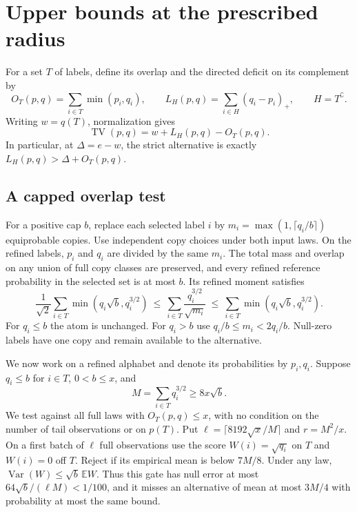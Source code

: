 \section{Upper bounds at the prescribed radius}
\label{sec:upper}

For a set \(T\) of labels, define its overlap and the directed deficit
on its complement by
\[
 O_T(p,q)=\sum_{i\in T}\min(p_i,q_i),\qquad
 L_H(p,q)=\sum_{i\in H}(q_i-p_i)_+,\qquad H=T^\complement .
\]
Writing \(w=q(T)\), normalization gives
\begin{equation}
 \operatorname{TV}(p,q)=w+L_H(p,q)-O_T(p,q).
 \label{eq:upper-head-tail}
\end{equation}
In particular, at \(\Delta=e-w\), the strict alternative is exactly
\(L_H(p,q)>\Delta+O_T(p,q)\).

\subsection{A capped overlap test}

For a positive cap \(b\), replace each selected label \(i\) by
\(m_i=\max(1,\lceil q_i/b\rceil)\) equiprobable copies. Use independent
copy choices under both input laws. On the refined labels,
\(p_i\) and \(q_i\) are divided by the same \(m_i\). The total mass and
overlap on any union of full copy classes are preserved, and every refined
reference probability in the selected set is at most \(b\). Its refined
moment satisfies
\begin{equation}
 \frac{1}{\sqrt{2}}\sum_{i\in T}\min(q_i\sqrt b,q_i^{3/2})
 \ \le\ \sum_{i\in T}\frac{q_i^{3/2}}{\sqrt{m_i}}
 \ \le\ \sum_{i\in T}\min(q_i\sqrt b,q_i^{3/2}).
 \label{eq:upper-clone-moment}
\end{equation}
For \(q_i\le b\) the atom is unchanged. For \(q_i>b\) use
\(q_i/b\le m_i<2q_i/b\). Null-zero labels have one copy and remain
available to the alternative.

We now work on a refined alphabet and denote its probabilities by \(p_i,q_i\).
Suppose \(q_i\le b\) for \(i\in T\), \(0<b\le x\), and
\[
   M=\sum_{i\in T}q_i^{3/2}\ge 8x\sqrt b.
\]
We test against all full laws with \(O_T(p,q)\le x\), with no condition
on the number of tail observations or on \(p(T)\). Put
\(\ell=\lceil8192\sqrt{x}/M\rceil\) and \(r=M^2/x\).
On a first batch of \(\ell\) full observations use the score
\(W(i)=\sqrt{q_i}\) on \(T\) and \(W(i)=0\) off \(T\). Reject if its empirical
mean is below \(7M/8\). Under any law,
\(\operatorname{Var}(W)\le\sqrt b\,\mathbb E W\).
Thus this gate has null error at most \(64\sqrt b/(\ell M)<1/100\),
and it misses an alternative of mean at most \(3M/4\) with probability
at most the same bound.

